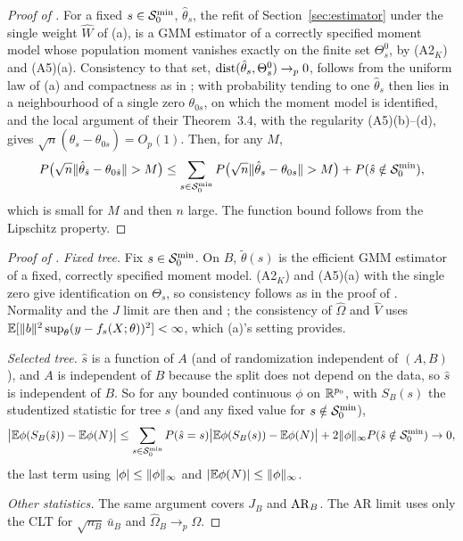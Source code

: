 \begin{proof}[Proof of ]
For a fixed $s \in \mathcal{S}_0^{\min}$, $\hat\theta_s$, the refit of Section~\ref{sec:estimator} under the single weight $\hat W$ of (a), is a GMM estimator of a correctly specified moment model whose population moment vanishes exactly on the finite set $\Theta_s^0$, by (A2$_K$) and (A5)(a). Consistency to that set, $\mathrm{dist}(\hat\theta_s, \Theta_s^0) \to_p 0$, follows from the uniform law of (a) and compactness as in \citet[Theorem 2.1]{neweymcfadden1994}; with probability tending to one $\hat\theta_s$ then lies in a neighbourhood of a single zero $\theta_{0s}$, on which the moment model is identified, and the local argument of their Theorem~3.4, with the regularity (A5)(b)--(d), gives $\sqrt n(\hat\theta_s - \theta_{0s}) = O_p(1)$. Then, for any $M$,
\[
P\bigl(\sqrt n\lVert \hat\theta_{\hat s} - \theta_{0\hat s}\rVert > M\bigr) \le \sum_{s \in \mathcal{S}_0^{\min}}P\bigl(\sqrt n\lVert \hat\theta_s - \theta_{0s}\rVert > M\bigr) + P(\hat s \notin \mathcal{S}_0^{\min}),
\]
which is small for $M$ and then $n$ large. The function bound follows from the Lipschitz property.
\end{proof}

\begin{proof}[Proof of ]
\emph{Fixed tree.} Fix $s \in \mathcal{S}_0^{\min}$. On $B$, $\tilde\theta(s)$ is the efficient GMM estimator of a fixed, correctly specified moment model. (A2$_K$) and (A5)(a) with the single zero give identification on $\Theta_s$, so consistency follows as in the proof of . Normality and the $J$ limit are then \citet{hansen1982} and \citet[Theorems 2.6 and 3.4]{neweymcfadden1994}; the consistency of $\hat\Omega$ and $\hat V$ uses $\mathbb{E}[\lVert b\rVert^2\sup_\theta(y - f_s(X;\theta))^2] < \infty$, which (a)'s setting provides.

\emph{Selected tree.} $\hat s$ is a function of $A$ (and of randomization independent of $(A, B)$), and $A$ is independent of $B$ because the split does not depend on the data, so $\hat s$ is independent of $B$. So for any bounded continuous $\phi$ on $\mathbb{R}^{p_0}$, with $S_B(s)$ the studentized statistic for tree $s$ (and any fixed value for $s \notin \mathcal{S}_0^{\min}$),
\[
\bigl\lvert\mathbb{E}\phi(S_B(\hat s)) - \mathbb{E}\phi(N)\bigr\rvert \le \sum_{s \in \mathcal{S}_0^{\min}}P(\hat s = s)\bigl\lvert\mathbb{E}\phi(S_B(s)) - \mathbb{E}\phi(N)\bigr\rvert + 2\lVert \phi\rVert_\infty P(\hat s \notin \mathcal{S}_0^{\min}) \to 0,
\]
the last term using $\lvert \phi\rvert \le \lVert \phi\rVert_\infty$ and $\lvert \mathbb{E}\phi(N)\rvert \le \lVert \phi\rVert_\infty$.

\emph{Other statistics.} The same argument covers $J_B$ and $\mathrm{AR}_B$. The AR limit uses only the CLT for $\sqrt{n_B}\,\bar u_B$ and $\hat\Omega_B \to_p \Omega$.
\end{proof}

